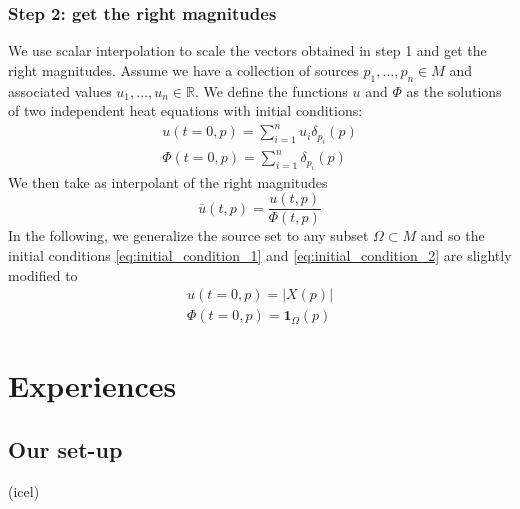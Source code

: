 \documentclass[sigconf]{acmart}
\begin{document}
\subsubsection{Step 2: get the right magnitudes}
We use scalar interpolation to scale the vectors obtained in step 1 and get the right magnitudes. Assume we have a collection of sources
$p_1, \dots, p_n \in M$ and associated values $u_1, \dots, u_n \in \mathbb{R}$. We define the functions $u$ and $\Phi$ 
as the solutions of two independent heat equations with initial conditions:
\begin{align}
  u(t = 0, p) = \sum_{i = 1}^nu_i\delta_{p_i}(p) \label{eq:initial_condition_1}\\
  \Phi(t = 0, p) = \sum_{i=1}^n\delta_{p_i}(p) \label{eq:initial_condition_2}
\end{align}
We then take as interpolant of the right magnitudes 
\begin{equation}
  \overline{u}(t,p) = \frac{u(t,p)}{\Phi(t,p)}
\end{equation}
In the following, we generalize the source set to any subset $\Omega \subset M$
and so the initial conditions \ref{eq:initial_condition_1} and \ref{eq:initial_condition_2}
are slightly modified to 
\begin{align*}
  u(t=0, p) = | X(p) | \\
  \Phi(t=0, p) = \mathbf{1}_{\Omega}(p)
\end{align*}



\begin{comment}
\begin{algorithm}
\caption{An algorithm with caption}\label{alg:cap}
\begin{algorithmic}
\Require $n \geq 0$
\Ensure $y = x^n$
\State $y \gets 1$
\State $X \gets x$
\State $N \gets n$
\While{$N \neq 0$}
\If{$N$ is even}
    \State $X \gets X \times X$
    \State $N \gets \frac{N}{2}$  \Comment{This is a comment}
\ElsIf{$N$ is odd}
    \State $y \gets y \times X$
    \State $N \gets N - 1$
\EndIf
\EndWhile
\end{algorithmic}
\end{algorithm}
\end{comment}

\section{Experiences}

\subsection{Our set-up}
(icel)
\end{document}
